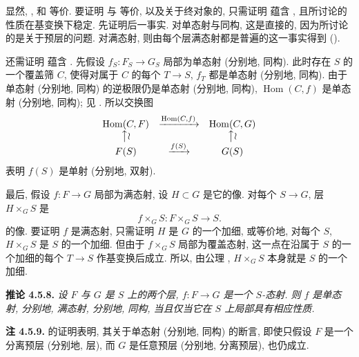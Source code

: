 显然, ,
 和
 等价.
要证明  与
 等价,
以及关于终对象的,
只需证明  蕴含
,
且所讨论的性质在基变换下稳定.
先证明后一事实. 对单态射与同构, 这是直接的,
因为所讨论的是关于预层的问题.
对满态射, 则由每个层满态射都是普遍的这一事实得到
().

还需证明  蕴含
.
先假设 \(f_S:F_S\to G_S\) 局部为单态射 (分别地, 同构).
此时存在 \(S\) 的一个覆盖筛 \(C\),
使得对属于 \(C\) 的每个 \(T\to S\),
\(f_T\) 都是单态射 (分别地, 同构).
由于单态射 (分别地, 同构) 的逆极限仍是单态射 (分别地, 同构),
\(\operatorname{Hom}(C,f)\) 是单态射 (分别地, 同构);
见 .
所以交换图
\[
\begin{array}{ccc}
 \operatorname{Hom}(C,F)
 &\xrightarrow{\operatorname{Hom}(C,f)}&
 \operatorname{Hom}(C,G)
 \\
 \big\uparrow\wr && \big\uparrow\wr
 \\
 F(S)&\xrightarrow{f(S)}&G(S)
\end{array}
\]
表明 \(f(S)\) 是单射 (分别地, 双射).

最后, 假设 \(f:F\to G\) 局部为满态射,
设 \(H\subset G\) 是它的像.
对每个 \(S\to G\), 层 \(H\times_GS\) 是
\[
  f\times_GS:F\times_GS\longrightarrow S.
\]
的像. 要证明 \(f\) 是满态射, 只需证明 \(H\) 是 \(G\) 的一个加细,
或等价地, 对每个 \(S\), \(H\times_GS\) 是 \(S\) 的一个加细.
但由于 \(f\times_GS\) 局部为覆盖态射,
这一点在沿属于 \(S\) 的一个加细的每个 \(T\to S\) 作基变换后成立.
所以, 由公理 ,
\(H\times_GS\) 本身就是 \(S\) 的一个加细.

\medskip
\noindent{}\textbf{推论 4.5.8.}
\textit{设 \(F\) 与 \(G\) 是 \(S\) 上的两个层,
\(f:F\to G\) 是一个 \(S\)-态射.
则 \(f\) 是单态射, 分别地, 满态射, 分别地, 同构,
当且仅当它在 \(S\) 上局部具有相应性质.}

\medskip
\noindent{}\textbf{注 4.5.9.}
 的证明表明,
其关于单态射 (分别地, 同构) 的断言,
即使只假设 \(F\) 是一个分离预层 (分别地, 层),
而 \(G\) 是任意预层 (分别地, 分离预层), 也仍成立.

